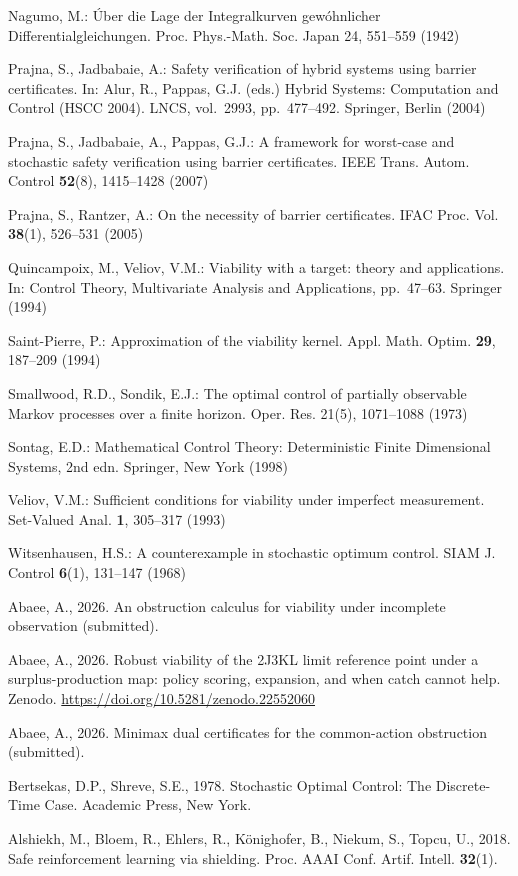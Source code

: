 \documentclass[10pt,twocolumn]{article}
\theoremstyle{definition}
\begin{document}
{Nagumo, M.: \'Uber die Lage der Integralkurven gew\'ohnlicher
Differentialgleichungen. Proc. Phys.-Math. Soc. Japan 24, 551--559
(1942)

Prajna, S., Jadbabaie, A.: Safety verification of hybrid systems using
barrier certificates. In: Alur, R., Pappas, G.J. (eds.) Hybrid Systems:
Computation and Control (HSCC 2004). LNCS, vol.~2993, pp.~477--492.
Springer, Berlin (2004)

Prajna, S., Jadbabaie, A., Pappas, G.J.: A framework for worst-case and
stochastic safety verification using barrier certificates. IEEE Trans.
Autom. Control \textbf{52}(8), 1415--1428 (2007)

Prajna, S., Rantzer, A.: On the necessity of barrier certificates. IFAC
Proc. Vol. \textbf{38}(1), 526--531 (2005)

Quincampoix, M., Veliov, V.M.: Viability with a target: theory and
applications. In: Control Theory, Multivariate Analysis and
Applications, pp.~47--63. Springer (1994)

Saint-Pierre, P.: Approximation of the viability kernel. Appl. Math.
Optim. \textbf{29}, 187--209 (1994)

Smallwood, R.D., Sondik, E.J.: The optimal control of partially
observable Markov processes over a finite horizon. Oper. Res. 21(5),
1071--1088 (1973)

Sontag, E.D.: Mathematical Control Theory: Deterministic Finite Dimensional Systems, 2nd edn. Springer, New York (1998)

Veliov, V.M.: Sufficient conditions for viability under imperfect
measurement. Set-Valued Anal. \textbf{1}, 305--317 (1993)

Witsenhausen, H.S.: A counterexample in stochastic optimum control.
SIAM J. Control \textbf{6}(1), 131--147 (1968)

Abaee, A., 2026. An obstruction calculus for viability under incomplete
observation (submitted).

Abaee, A., 2026. Robust viability of the 2J3KL limit reference point
under a surplus-production map: policy scoring, expansion, and when
catch cannot help. Zenodo.
\url{https://doi.org/10.5281/zenodo.22552060}

Abaee, A., 2026. Minimax dual certificates for the common-action
obstruction (submitted).

Bertsekas, D.P., Shreve, S.E., 1978. Stochastic Optimal Control: The
Discrete-Time Case. Academic Press, New York.

Alshiekh, M., Bloem, R., Ehlers, R., K\"{o}nighofer, B., Niekum, S.,
Topcu, U., 2018. Safe reinforcement learning via shielding. Proc. AAAI
Conf. Artif. Intell. \textbf{32}(1).

}
\end{document}
